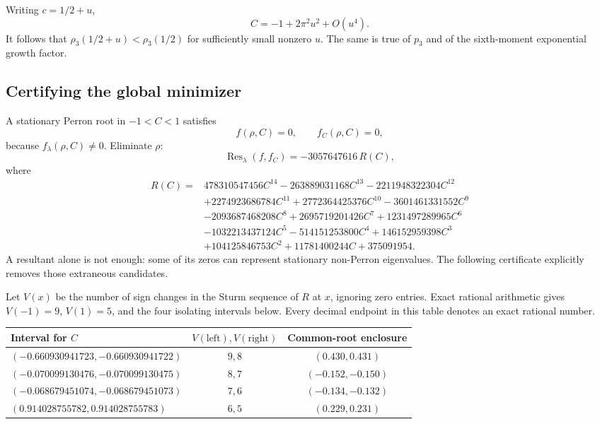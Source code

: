 \documentclass[11pt,a4paper]{article}
\numberwithin{equation}{section}
\theoremstyle{definition}
\theoremstyle{remark}
\newcommand{\Res}{\operatorname{Res}}
\begin{document}
Writing $c=1/2+u$,
\[
 C=-1+2\pi^2u^2+O(u^4).
\]
It follows that $\rho_3(1/2+u)<\rho_3(1/2)$ for sufficiently small
nonzero $u$. The same is true of $p_3$ and of the sixth-moment
exponential growth factor.

\subsection{Certifying the global minimizer}
A stationary Perron root in $-1<C<1$ satisfies
\[
 f(\rho,C)=0,\qquad f_C(\rho,C)=0,
\]
because $f_\lambda(\rho,C)\neq0$. Eliminate $\rho$:
\begin{equation}
 \Res_\lambda(f,f_C)=-3057647616\,R(C),
 \label{eq:resultant-id}
\end{equation}
where
\begin{equation}
\begin{aligned}
 R(C)={}&478310547456C^{14}-263889031168C^{13}
 -2211948322304C^{12}\\
 &+2274923686784C^{11}+2772364425376C^{10}
 -3601461331552C^9\\
 &-2093687468208C^8+2695719201426C^7
 +1231497289965C^6\\
 &-1032213437124C^5-514151253800C^4
 +146152959398C^3\\
 &+104125846753C^2+11781400244C+375091954.
 \end{aligned}
\label{eq:resultant-R}
\end{equation}
A resultant alone is not enough: some of its zeros can represent
stationary non-Perron eigenvalues. The following certificate explicitly
removes those extraneous candidates.

Let $V(x)$ be the number of sign changes in the Sturm sequence of $R$
at $x$, ignoring zero entries. Exact rational arithmetic gives
$V(-1)=9$, $V(1)=5$, and the four isolating intervals below.
Every decimal endpoint in this table denotes an exact rational number.

\begin{center}
\small
\begin{tabular}{@{}p{}cc@{}}
\toprule
Interval for $C$ & $V(\text{left}),V(\text{right})$
 & Common-root enclosure\\
\midrule
$(-0.660930941723,-0.660930941722)$ & $9,8$ & $(0.430,0.431)$\\
$(-0.070099130476,-0.070099130475)$ & $8,7$ & $(-0.152,-0.150)$\\
$(-0.068679451074,-0.068679451073)$ & $7,6$ & $(-0.134,-0.132)$\\
$(0.914028755782,0.914028755783)$ & $6,5$ & $(0.229,0.231)$\\
\bottomrule
\end{tabular}
\end{center}
\end{document}
